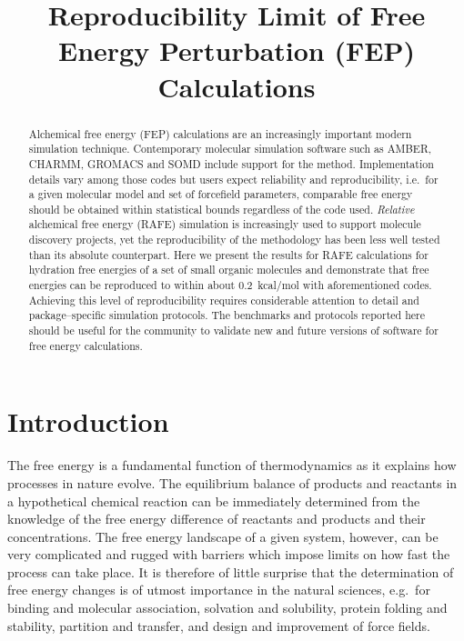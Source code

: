 \documentclass[journal=jctcce,manuscript=article]{achemso}
\title{\color{red}Reproducibility Limit of Free Energy Perturbation (FEP) Calculations}
\begin{document}
\begin{abstract}
  Alchemical free energy (FEP) calculations are an increasingly
  important modern simulation technique.  Contemporary molecular
  simulation software such as AMBER, CHARMM, GROMACS and SOMD include
  support for the method.  Implementation details vary among those
  codes but users expect reliability and reproducibility, i.e.\ for a
  given molecular model and set of forcefield parameters, comparable
  free energy should be obtained within statistical bounds regardless
  of the code used.  \emph{Relative} alchemical free energy (RAFE)
  simulation is increasingly used to support molecule discovery
  projects, yet the reproducibility of the methodology has been less
  well tested than its absolute counterpart.  Here we present the
  results for RAFE calculations for hydration free energies of a set
  of small organic molecules and demonstrate that free energies can be
  reproduced to within about \SI{0.2}{kcal/mol} with aforementioned
  codes.  Achieving this level of reproducibility requires considerable
  attention to detail and package--specific simulation protocols. The
  benchmarks and protocols reported here should be useful for the
  community to validate new and future versions of software for free
  energy calculations.
\end{abstract}

\begin{tocentry}
\end{tocentry}

\section{Introduction}
\label{sec:intro}

The free energy is a fundamental function of thermodynamics as it explains
how processes in nature evolve.  The equilibrium balance of products and reactants in a hypothetical chemical reaction can be immediately determined
from the knowledge of the free energy difference of reactants and
products and their concentrations.  The free energy landscape of a given
system, however, can be very complicated and rugged with barriers which impose
limits on how fast the process can take place.  It is therefore of
little surprise that the determination of free energy changes is of
utmost importance in the natural sciences, e.g.\ for binding and
molecular association, solvation and solubility, protein folding and
stability, partition and transfer, and design and improvement of force
fields.
\end{document}
